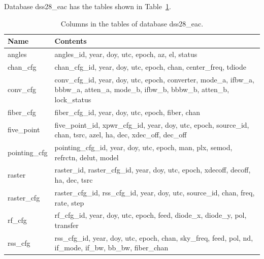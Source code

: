 \documentclass[letterpaper,11pt]{report}
\begin{document}
Database {\ttfamily dss28\_eac} has the tables shown in Table~\ref{tab:eac-cols}.
\begin{table}[h!tb]
    \caption{\label{tab:eac-cols}Columns in the tables of database 
        {\ttfamily dss28\_eac}.}
\begin{center}
    \begin{tabular}{l|p{4in}}
        \hline
        Name                       & Contents \\
        \hline
        {\ttfamily angles}         & angles\_id, year, doy, utc, epoch, az, el, 
                                     status \\
        {\ttfamily chan\_cfg}      & chan\_cfg\_id, year, doy, utc, epoch, chan, 
                                     center\_freq, tdiode \\
        {\ttfamily conv\_cfg}      & conv\_cfg\_id, year, doy, utc, epoch, 
                                     converter, mode\_a, ifbw\_a, bbbw\_a, 
                                     atten\_a, mode\_b, ifbw\_b, bbbw\_b, 
                                     atten\_b, lock\_status \\
        {\ttfamily fiber\_cfg}     & fiber\_cfg\_id, year, doy, utc, epoch, 
                                     fiber, chan \\
        {\ttfamily five\_point}    & five\_point\_id, xpwr\_cfg\_id, year, doy,
                                     utc, epoch, source\_id, chan, tsrc, azel,
                                     ha, dec, xdec\_off, dec\_off \\
        {\ttfamily pointing\_cfg}  & pointing\_cfg\_id, year, doy, utc, epoch, 
                                     man, plx, semod, refrctn, delut, model \\
        {\ttfamily raster}         & raster\_id,  raster\_cfg\_id, year, doy, utc,
                                     epoch, xdecoff, decoff, ha, dec, tsrc \\
        {\ttfamily raster\_cfg}    & raster\_cfg\_id, rss\_cfg\_id, year, doy, 
                                     utc, source\_id, chan, freq, rate, step \\
        {\ttfamily rf\_cfg}        & rf\_cfg\_id, year, doy, utc, epoch, feed,
                                     diode\_x, diode\_y, pol, transfer \\
        {\ttfamily rss\_cfg}       & rss\_cfg\_id, year, doy, utc, epoch, chan,
                                     sky\_freq, feed, pol, nd, if\_mode, if\_bw,
                                     bb\_bw, fiber\_chan\\

\end{tabular}
\end{center}
\end{table}
\end{document}
